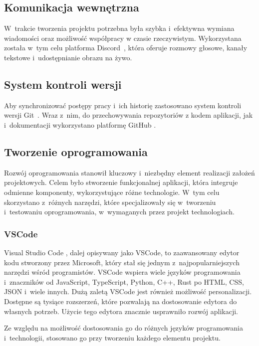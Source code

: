 \subsection{Komunikacja wewnętrzna}

W~trakcie tworzenia projektu potrzebna była szybka i~efektywna
wymiana wiadomości oraz możliwość współpracy w czasie rzeczywistym.
Wykorzystana została w~tym celu platforma Discord~\cite{Discord},
która oferuje rozmowy głosowe, kanały tekstowe i~udostępnianie
obrazu na żywo.


\subsection{System kontroli wersji}

Aby synchronizować postępy pracy i~ich historię zastosowano
system kontroli wersji Git~\cite{Git}. Wraz z~nim, do przechowywania
repozytoriów z kodem aplikacji, jak i~dokumentacji wykorzystano
platformę GitHub \cite{Github}.


\subsection{Tworzenie oprogramowania}

Rozwój oprogramowania stanowił kluczowy i~niezbędny element realizacji
założeń projektowych.
Celem było stworzenie funkcjonalnej aplikacji, która integruje
odmienne komponenty, wykorzystujące różne technologie.
W~tym celu skorzystano z~różnych narzędzi, które specjalizowały się
w~tworzeniu i~testowaniu oprogramowania, w~wymaganych przez projekt
technologiach.


\subsubsection{VSCode}

Visual Studio Code \cite{VSCode}, dalej opisywany jako VSCode,
to zaawansowany edytor kodu stworzony
przez Microsoft, który stał się jednym z~najpopularniejszych narzędzi
wśród programistów\cite{IDEIndex}.
VSCode wspiera wiele języków programowania i~znaczników od JavaScript,
TypeScript, Python, C++, Rust po HTML, CSS, JSON i~wiele innych.
Dużą zaletą VSCode jest również możliwość personalizacji. Dostępne są
tysiące rozszerzeń, które pozwalają na dostosowanie edytora do własnych
potrzeb. Użycie tego edytora znacznie usprawniło rozwój aplikacji.

Ze względu na możliwość dostosowania go do różnych języków programowania
i~technologii, stosowano go przy tworzeniu każdego elementu projektu.


